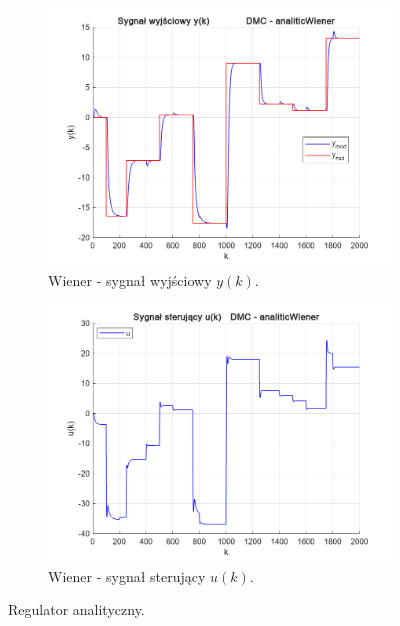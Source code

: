 \begin{figure}[b!]
\begin{subfigure}[b]{0.49\paperwidth}
\centering
\includegraphics[width=\linewidth]{pictures/y_analiticWiener}
\caption{Wiener - sygnał wyjściowy $y(k)$.}
\end{subfigure}
\hfill
\begin{subfigure}[b]{0.49\paperwidth}
\centering
\includegraphics[width=\linewidth]{pictures/u_analiticWiener}
\caption{Wiener - sygnał sterujący $u(k)$.}
\end{subfigure}

\caption{Regulator analityczny.}
\end{figure}

\newpage

